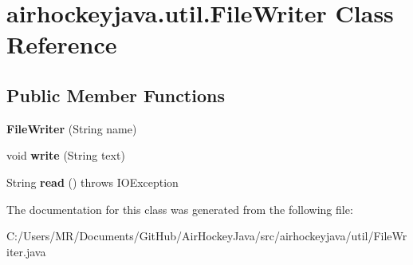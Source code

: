 \hypertarget{classairhockeyjava_1_1util_1_1_file_writer}{}\section{airhockeyjava.\+util.\+File\+Writer Class Reference}
\label{classairhockeyjava_1_1util_1_1_file_writer}
\subsection*{Public Member Functions}
\begin{DoxyCompactItemize}
\item 
\hypertarget{classairhockeyjava_1_1util_1_1_file_writer_adb1bd8d831435040aac0d2c8fd85acb0}{}{\bfseries File\+Writer} (String name)\label{classairhockeyjava_1_1util_1_1_file_writer_adb1bd8d831435040aac0d2c8fd85acb0}

\item 
\hypertarget{classairhockeyjava_1_1util_1_1_file_writer_ae2b90653ca8de2c691da97255c6b4a26}{}void {\bfseries write} (String text)\label{classairhockeyjava_1_1util_1_1_file_writer_ae2b90653ca8de2c691da97255c6b4a26}

\item 
\hypertarget{classairhockeyjava_1_1util_1_1_file_writer_ae213dab64cabb14b7b8503f61ad5e5bf}{}String {\bfseries read} ()  throws I\+O\+Exception\label{classairhockeyjava_1_1util_1_1_file_writer_ae213dab64cabb14b7b8503f61ad5e5bf}

\end{DoxyCompactItemize}


The documentation for this class was generated from the following file\+:\begin{DoxyCompactItemize}
\item 
C\+:/\+Users/\+M\+R/\+Documents/\+Git\+Hub/\+Air\+Hockey\+Java/src/airhockeyjava/util/File\+Writer.\+java\end{DoxyCompactItemize}
